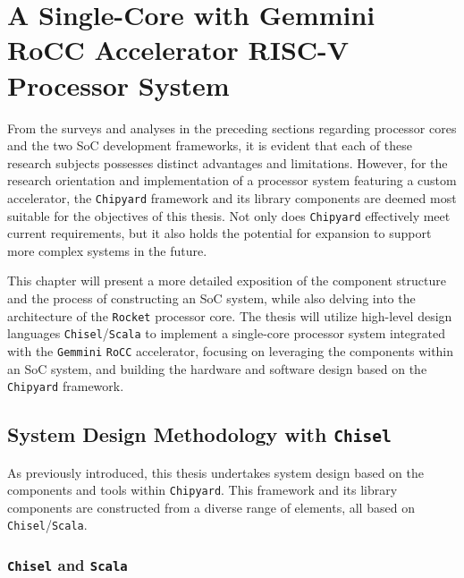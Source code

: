 \chapter{A Single-Core with Gemmini RoCC Accelerator RISC-V Processor System}
\label{chap:SingleCoreGemminiRiscVSystem}

From the surveys and analyses in the preceding sections regarding processor cores and the two SoC development frameworks, it is evident that each of these research subjects possesses distinct advantages and limitations. However, for the research orientation and implementation of a processor system featuring a custom accelerator, the \texttt{Chipyard} framework and its library components are deemed most suitable for the objectives of this thesis. Not only does \texttt{Chipyard} effectively meet current requirements, but it also holds the potential for expansion to support more complex systems in the future.

This chapter will present a more detailed exposition of the component structure and the process of constructing an SoC system, while also delving into the architecture of the \texttt{Rocket} processor core. The thesis will utilize high-level design languages \texttt{Chisel}/\texttt{Scala} to implement a single-core processor system integrated with the \texttt{Gemmini} \texttt{RoCC} accelerator, focusing on leveraging the components within an SoC system, and building the hardware and software design based on the \texttt{Chipyard} framework.

\section{System Design Methodology with \texttt{Chisel}}
\label{sec:design_methodology_chisel}

As previously introduced, this thesis undertakes system design based on the components and tools within \texttt{Chipyard}. This framework and its library components are constructed from a diverse range of elements, all based on \texttt{Chisel}/\texttt{Scala}.

\subsection{\texttt{Chisel} and \texttt{Scala}}
\label{subsec:chisel_scala}

